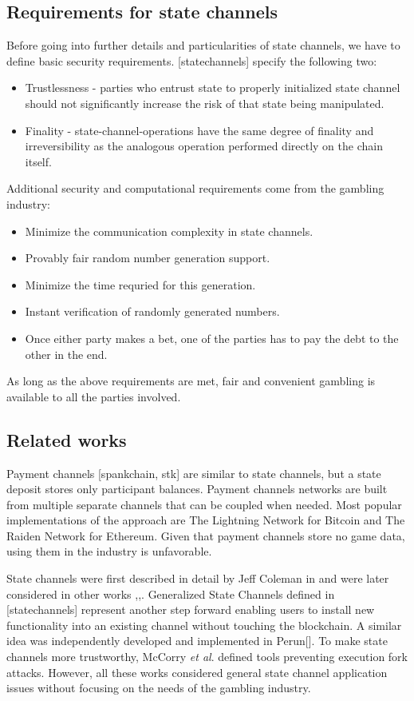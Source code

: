 		\subsection {Requirements for state channels}
	Before going into further details and particularities of state channels, we have to define basic security requirements. [statechannels] specify the following two:
	\begin{itemize}
		\item Trustlessness - parties who entrust state to properly initialized state channel should not significantly increase the risk of that state being manipulated. 
		\item Finality - state-channel-operations have the same degree of finality and irreversibility as the analogous operation performed directly on the chain itself.
	\end{itemize}
	Additional security and computational requirements come from the gambling industry:
	\begin{itemize}
		\item Minimize the communication complexity in state channels.
		\item Provably fair random number generation support.
		\item Minimize the time requried for this generation.
		\item Instant verification of randomly generated numbers.
		\item Once either party makes a bet, one of the parties has to pay the debt to the other in the end. 
	\end{itemize}

	As long as the above requirements are met, fair and convenient gambling is available to all the parties involved.

		\subsection {Related works} 
	Payment channels [spankchain, stk] are similar to state channels, but a state deposit stores only participant balances. Payment channels networks are built from multiple separate channels that can be coupled when needed. Most popular implementations of the approach are The Lightning Network for Bitcoin and The Raiden Network for Ethereum. Given that payment channels store no game data, using them in the industry is unfavorable. 

	State channels were first described in detail by Jeff Coleman in \cite{bib5} and were later considered in other works \cite{bib6},\cite{bib7},\cite{bib8}. Generalized State Channels defined in [statechannels] represent another step forward enabling users to install new functionality into an existing channel without touching the blockchain. A similar idea was independently developed and implemented in Perun[]. To make state channels more trustworthy, McCorry \textit {et al}. \cite{bib9} defined tools preventing execution fork attacks. However, all these works considered general state channel application issues without focusing on the needs of the gambling industry.

